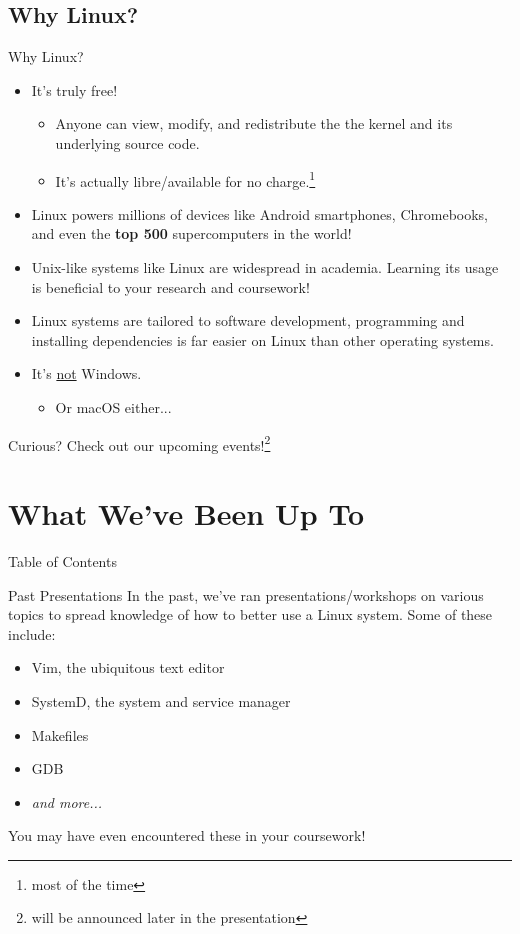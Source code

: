 \documentclass{beamer}
\begin{document}
\subsection{Why Linux?}
\begin{frame}{Why Linux?}
	\begin{itemize}
		\item It's truly free!
		      \pause
		      \begin{itemize}
			      \item Anyone can view, modify, and redistribute
			            the the kernel and its underlying
			            source code.
			            \pause
			      \item It's actually libre/available for no
			            charge.\footnote{most of the time}
			            \pause
		      \end{itemize}
		\item Linux powers millions of devices like Android
		      smartphones, Chromebooks, and even the \textbf{top 500}
		      supercomputers in the world!
		      \pause
		\item Unix-like systems like Linux are widespread in academia.
		      Learning its usage is beneficial to your research and
		      coursework!
		      \pause
		\item Linux systems are tailored to software development,
		      programming and installing dependencies is far easier
		      on Linux than other operating systems.
		      \pause
		\item It's \underline{not} Windows.
		      \pause
		      \begin{itemize}
			      \item Or macOS either...
		      \end{itemize}
		      \pause
	\end{itemize}
	Curious? Check out our upcoming events!\footnote{will be
		announced later in the presentation}
\end{frame}

\section{What We've Been Up To}
\begin{frame}{Table of Contents}
	\tableofcontents[currentsection]
\end{frame}

\begin{frame}{Past Presentations}
	In the past, we've ran presentations/workshops on various topics to
	spread knowledge of how to better use a Linux system. Some of these
	include:
	\pause
	\begin{itemize}
		\item Vim, the ubiquitous text editor
		      \pause
		\item SystemD, the system and service manager
		      \pause
		\item Makefiles
		      \pause
		\item GDB
		      \pause
		\item \textit{and more...}
		      \pause
	\end{itemize}
	You may have even encountered these in your coursework!
\end{frame}
\end{document}

